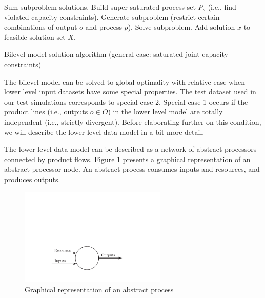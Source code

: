 \vspace{12pt}
\begin{algorithm}[H]
  \DontPrintSemicolon
  \BlankLine
  Sum subproblem solutions. \;
  Build super-saturated process set $P_s$ (i.e., find violated capacity constraints). \;
   {
    Generate subproblem (restrict certain combinations of output $o$ and process $p$). \;
    Solve subproblem. \;
     {
        Add solution $x$ to feasible solution set $X$. \;
    }
  }
   \;
  \caption{Bilevel model solution algorithm (general case: saturated joint capacity constraints)}
  \label{alg:bilevel_generalcase}
\end{algorithm}
\vspace{12pt}

The bilevel model can be solved to global optimality with relative ease when lower level input datasets have some special properties. 
The test dataset used in our test simulations corresponds to special case 2.
Special case 1 occurs if the product lines (i.e., outputs $o \in O$) in the lower level model are totally independent (i.e., strictly divergent). 
Before elaborating further on this condition, we will describe the lower level data model in a bit more detail.

The lower level data model can be described as a network of abstract processors connected by product flows.
Figure \ref{fig:abstract_process} presents a graphical representation of an abstract processor node.
An abstract process consumes inputs and resources, and produces outputs.

\begin{figure}[h]
  \centering
  \includegraphics[width=70mm]{images/abstract_process}
  \caption{Graphical representation of an abstract process}
  \label{fig:abstract_process}
\end{figure}
 
